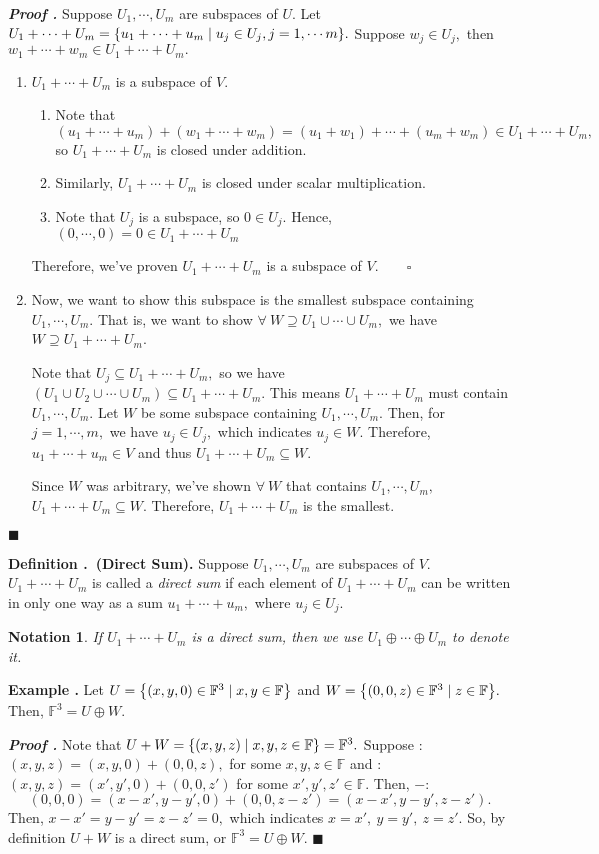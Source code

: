 \documentclass[11pt, letterpaper]{article}
\newcounter{ndf}[subsection]
\newenvironment*{df}[1]{\par\noindent\textbf{Definition \thesubsection.\stepcounter{ndf}\thendf\ (#1).}}{\par}
\newcounter{neg}[subsection]
\newenvironment*{eg}{\par\noindent\textbf{Example \thesubsection.\stepcounter{neg}\theneg}}{\par}
\newcounter{nprf}[subsection]
\newenvironment*{prf}{\par\noindent\textbf{\textit{Proof \stepcounter{nprf}\thenprf.}}}{\hfill$\blacksquare$\par}
\newtheorem{nota}{Notation}[section]
\def\F{\mathbb{F}}
\begin{document}
	\begin{prf}
		Suppose $U_1,\cdots,U_m$ are subspaces of $U$. Let $U_1+\cdots+U_m=\qty{u_1+\cdots+u_m\mid u_j\in U_j, j=1,\cdots m}.$ Suppose $w_j\in U_j,$ then $w_1+\cdots+w_m\in U_1+\cdots+U_m.$
		\begin{enumerate}
			\item $U_1+\cdots+U_m$ is a subspace of $V$.
			\begin{enumerate}
				\item Note that \[(u_1+\cdots+u_m)+(w_1+\cdots+w_m)=(u_1+w_1)+\cdots+(u_m+w_m)\in U_1+\cdots+U_m,\] so $U_1+\cdots+U_m$ is closed under addition.
				\item Similarly, $U_1+\cdots+U_m$ is closed under scalar multiplication.
				\item Note that $U_j$ is a subspace, so $0\in U_j.$ Hence, $(0,\cdots,0)=0\in U_1+\cdots+U_m$
			\end{enumerate}
			Therefore, we've proven $U_1+\cdots+U_m$ is a subspace of $V.\qquad\square$
			\item Now, we want to show this subspace is the smallest subspace containing $U_1,\cdots,U_m.$ That is, we want to show $\forall\ W\supseteq U_1\cup\cdots\cup U_m,$ we have $W\supseteq U_1+\cdots+U_m$.\par Note that $U_j\subseteq U_1+\cdots+U_m,$ so we have $(U_1\cup U_2\cup\cdots\cup U_m)\subseteq U_1+\cdots+U_m$. This means $U_1+\cdots+U_m$ must contain $U_1,\cdots,U_m.$ Let $W$ be some subspace containing $U_1,\cdots,U_m.$ Then, for $j=1,\cdots,m,$ we have $u_j\in U_j,$ which indicates $u_j\in W.$ Therefore, $u_1+\cdots+u_m\in V$ and thus $U_1+\cdots+U_m\subseteq W.$\par Since $W$ was arbitrary, we've shown $\forall\ W$ that contains $U_1,\cdots,U_m,$ $U_1+\cdots+U_m\subseteq W.$ Therefore, $U_1+\cdots+U_m$ is the smallest. 
		\end{enumerate}
	\end{prf}
\begin{df}{Direct Sum}
	Suppose $U_1,\cdots,U_m$ are subspaces of $V.$ $U_1+\cdots+U_m$ is called a \textit{direct sum} if each element of $U_1+\cdots+U_m$ can be written in only one way as a sum $u_1+\cdots+u_m,$ where $u_j\in U_j.$
\end{df}
\begin{nota}
	If $U_1+\cdots+U_m$ is a direct sum, then we use $U_1\oplus\cdots\oplus U_m$ to denote it.	
\end{nota}
\begin{eg}
	Let $U=\qty{(x,y,0)\in\F^3\mid x,y\in\F}$ and $W=\qty{(0,0,z)\in\F^3\mid z\in\F}.$ Then, $\F^3=U\oplus W.$
	\begin{prf}
		Note that $U+W=\qty{(x,y,z)\mid x,y,z\in\F}=\F^3.$ Suppose : $(x,y,z)=(x,y,0)+(0,0,z),$ for some $x,y,z\in\F$ and : $(x,y,z)=(x',y',0)+(0,0,z')$ for some $x',y',z'\in\F.$ Then, $-$: \[(0,0,0)=(x-x',y-y',0)+(0,0,z-z')=(x-x',y-y',z-z').\] Then, $x-x'=y-y'=z-z'=0,$ which indicates $x=x',\ y=y',\ z=z'.$ So, by definition $U+W$ is a direct sum, or $\F^3=U\oplus W.$
	\end{prf}
\end{eg}
\end{document}
